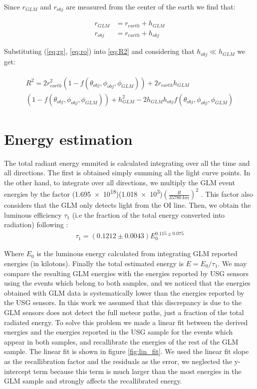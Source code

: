 Since $r_{GLM}$ and $r_{obj}$ are measured from the center of the earth we find that:

\begin{align}
  r_{GLM} &= r_{earth} + h_{GLM} \label{eq:rg}\\
  r_{obj} &= r_{earth} + h_{obj} \label{eq:ro}
\end{align}

Substituting (\ref{eq:rg}, \ref{eq:ro}) into \ref{eq:R2} and considering that $h_{obj} \ll h_{GLM}$ we get:

\begin{align}
  \begin{split}
    R^2 = 2r_{earth}^2\left(1-f(\theta_{obj}, \phi_{obj}, \phi_{GLM})\right) +2r_{earth}h_{GLM}\\
    \left(1-f(\theta_{obj}, \phi_{obj}, \phi_{GLM})\right) + h_{GLM}^2 - 2h_{GLM}h_{obj}f(\theta_{obj}, \phi_{obj}, \phi_{GLM})
    \end{split}
\end{align}

\section{Energy estimation}
\label{app:energy}
The total radiant energy emmited is calculated integrating over all the time and all directions. The first is obtained simply summing all the light curve points. In the other hand, to integrate over all directions, we multiply the GLM event energies by the factor (\SI{1.695e18}{})(\SI{1.018e3}{})$\left(\frac{R}{35780~km}\right)^2$ \citep{Jenniskens:2018}. This factor also considers that the GLM only detects light from the OI line. Then, we obtain the luminous efficiency $\tau_1$ (i.e the fraction of the total energy converted into radiation) following \citet{Brown:2002}:
\begin{align}
  \tau_1 = (0.1212\pm 0.0043)E_0^{0.115\pm 0.075}
\end{align}

Where $E_0$ is the luminous energy calculated from integrating GLM reported energies (in kilotons). Finally the total estimated energy is $E = E_0/\tau_1$. We may compare the resulting GLM energies with the energies reported by USG sensors using the events which belong to both samples, and we noticed that the energies obtained with GLM data is systematically lower than the energies reported by the USG sensors. In this work we assumed that this discrepancy is due to the GLM sensors does not detect the full meteor paths, just a fraction of the total radiated energy. To solve this problem we made a linear fit between the derived energies and the energies reported in the USG sample for the events which appear in both samples, and recallibrate the energies of the rest of the GLM sample. The linear fit is shown in figure \ref{fig:lin_fit}. We used the linear fit slope as the recallibration factor and the residuals as the error, we neglected the y-intercept term because this term is much larger than the most energies in the GLM sample and strongly affects the recallibrated energy.

